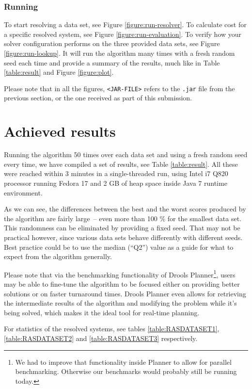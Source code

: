 \documentclass[10pt,a4paper,final]{article}
\begin{document}
\subsubsection{Running}

To start resolving a data set, see Figure \ref{figure:run-resolver}. To calculate cost for a specific resolved system, see Figure \ref{figure:run-evaluation}. To verify how your solver configuration performs on the three provided data sets, see Figure \ref{figure:run-lookup}. It will run the algorithm many times with a fresh random seed each time and provide a summary of the results, much like in Table \ref{table:result} and Figure \ref{figure:plot}.

Please note that in all the figures, \texttt{<JAR-FILE>} refers to the \texttt{.jar} file from the previous section, or the one received as part of this submission.

\section{Achieved results}

Running the algorithm 50 times over each data set and using a fresh random seed every time, we have compiled a set of results, see Table \ref{table:result}. All these were reached within 3 minutes in a single-threaded run, using Intel i7 Q820 processor running Fedora 17 and 2 GB of heap space inside Java 7 runtime environment.

As we can see, the differences between the best and the worst scores produced by the algorithm are fairly large~-- even more than 100 \% for the smallest data set. This randomness can be eliminated by providing a fixed seed. That may not be practical however, since various data sets behave differently with different seeds. Best practice could be to use the median (``Q2'') value as a guide for what to expect from the algorithm generally.

Please note that via the benchmarking functionality of Drools Planner\footnote{We had to improve that functionality inside Planner to allow for parallel benchmarking. Otherwise our benchmarks would probably still be running today.}, users may be able to fine-tune the algorithm to be focused either on providing better solutions or on faster turnaround times. Drools Planner even allows for retrieving the intermediate results of the algorithm and modifying the problem while it's being solved, which makes it the ideal tool for real-time planning.

For statistics of the resolved systems, see tables \ref{table:RASDATASET1}, \ref{table:RASDATASET2} and \ref{table:RASDATASET3} respectively. 
\end{document}
